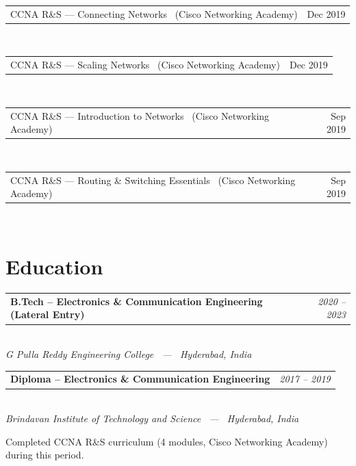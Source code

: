 \documentclass[10pt, a4paper]{article}
\makeatletter
\newcommand{\expentry}[3]{%
  \vspace{6pt}%
  \noindent
  \begin{tabularx}{\linewidth}{@{}X r@{}}
    \textbf{\color{darkgray}#1} & \textit{\color{lightgray}#3}
  \end{tabularx}\\[-2pt]
  \textit{\color{headblue}\small #2}%
  \vspace{3pt}%
}
\newcommand{\certrow}[2]{%
  \noindent
  \begin{tabularx}{\linewidth}{@{}X r@{}}
    {\color{midgray}#1} & {\color{lightgray}\small #2}
  \end{tabularx}\\[2pt]
}
\makeatother
\begin{document}
\certrow%
  {CCNA R\&S --- Connecting Networks \ \textnormal{\small(Cisco Networking Academy)}}%
  {Dec 2019}

\certrow%
  {CCNA R\&S --- Scaling Networks \ \textnormal{\small(Cisco Networking Academy)}}%
  {Dec 2019}

\certrow%
  {CCNA R\&S --- Introduction to Networks \ \textnormal{\small(Cisco Networking Academy)}}%
  {Sep 2019}

\certrow%
  {CCNA R\&S --- Routing \& Switching Essentials \ \textnormal{\small(Cisco Networking Academy)}}%
  {Sep 2019}

\section{Education}

\expentry%
  {B.Tech -- Electronics \& Communication Engineering (Lateral Entry)}%
  {G Pulla Reddy Engineering College \ --- \ Hyderabad, India}%
  {2020 -- 2023}

\expentry%
  {Diploma -- Electronics \& Communication Engineering}%
  {Brindavan Institute of Technology and Science \ --- \ Hyderabad, India}%
  {2017 -- 2019}

{\small\color{lightgray}Completed CCNA R\&S curriculum (4 modules, Cisco Networking Academy) during this period.}

\end{document}
